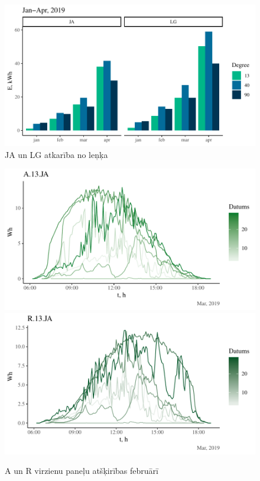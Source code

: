 \begin{figure}[h]
    \centering
    \includegraphics[width=\linewidth]{figures/results/degType.pdf}
    \caption{JA un LG atkarība no leņķa}
    \label{fig:lg_ja_deg}
\end{figure}

\begin{figure}[h]
    \centering
    \includegraphics[width=\linewidth]{figures/sol_day/mar_A13JA.pdf}
    \includegraphics[width=\linewidth]{figures/sol_day/mar_R13JA.pdf}
    \caption{A un R virzienu paneļu atšķirības februārī}
    \label{fig:feb_ar}
\end{figure}

